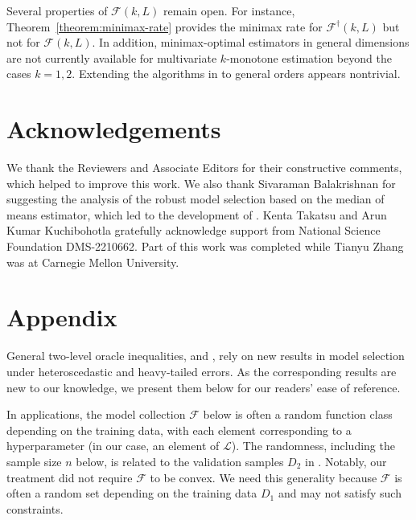 \documentclass[12pt]{article}
\begin{document}
Several properties of $\mathcal{F}(k,L)$ remain open. For instance, Theorem~\ref{theorem:minimax-rate} provides the minimax rate for $\mathcal{F}^\dag(k,L)$ but not for $\mathcal{F}(k,L)$. In addition, minimax-optimal estimators in general dimensions are not currently available for multivariate $k$-monotone estimation beyond the cases $k=1,2$. Extending the algorithms in  to general orders appears nontrivial.

\section*{Acknowledgements}
We thank the Reviewers and Associate Editors for their constructive comments, which helped to improve this work. We also thank Sivaraman Balakrishnan for suggesting the analysis of the robust model selection based on the median of means estimator, which led to the development of . Kenta Takatsu and Arun Kumar Kuchibohotla gratefully acknowledge support from National Science Foundation DMS-2210662. Part of this work was completed while Tianyu Zhang was at Carnegie Mellon University. 

    \appendix
    \section{Appendix}\label{sec:model-selection}

General two-level oracle inequalities,  and , rely on new results in model selection under heteroscedastic and heavy-tailed errors. As the corresponding results are new to our knowledge, we present them below for our readers' ease of reference. 

In applications, the model collection $\mathcal{F}$ below is often a random function class depending on the training data, with each element corresponding to a hyperparameter (in our case, an element of $\mathcal{L}$). The randomness, including the sample size $n$ below, is related to the validation samples $D_2$ in . Notably, our treatment did not require $\mathcal{F}$ to be convex. We need this generality because $\mathcal{F}$ is often a random set depending on the training data $D_1$ and may not satisfy such constraints.
\end{document}
